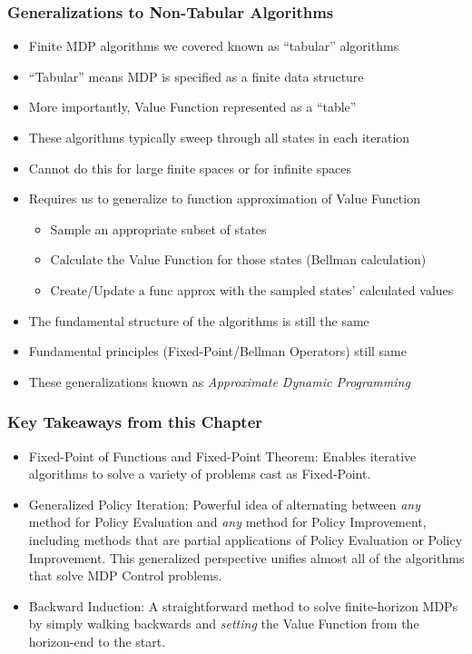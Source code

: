 \documentclass[handout]{beamer}
\begin{document}
\begin{frame}
\frametitle{Generalizations to Non-Tabular Algorithms}
\begin{itemize}[<+->]
\item Finite MDP algorithms we covered known as ``tabular'' algorithms
\item ``Tabular'' means MDP is specified as a finite data structure
\item More importantly, Value Function represented as a ``table''
\item These algorithms typically sweep through all states in each iteration
\item Cannot do this for large finite spaces or for infinite spaces
\item Requires us to generalize to function approximation of Value Function
\begin{itemize}[<+->]
\item Sample an appropriate subset of states 
\item Calculate the Value Function for those states (Bellman calculation)
\item Create/Update a func approx with the sampled states' calculated values
\end{itemize}
\item  The fundamental structure of the algorithms is still the same
\item Fundamental principles (Fixed-Point/Bellman Operators) still same
\item These generalizations known as {\em Approximate Dynamic Programming}
 \end{itemize}
\end{frame}


\begin{frame}
\frametitle{Key Takeaways from this Chapter}
\pause
\begin{itemize}[<+->]
\item Fixed-Point of Functions and Fixed-Point Theorem: Enables iterative algorithms to solve a variety of problems cast as Fixed-Point.
\item Generalized Policy Iteration: Powerful idea of alternating between {\em any} method for Policy Evaluation and {\em any} method for Policy Improvement, including methods that are partial applications of Policy Evaluation or Policy Improvement. This generalized perspective unifies almost all of the algorithms that solve MDP Control problems.
\item Backward Induction: A straightforward method to solve finite-horizon MDPs by simply walking backwards and {\em setting} the Value Function from the horizon-end to the start.
\end{itemize}
\end{frame}
\end{document}
